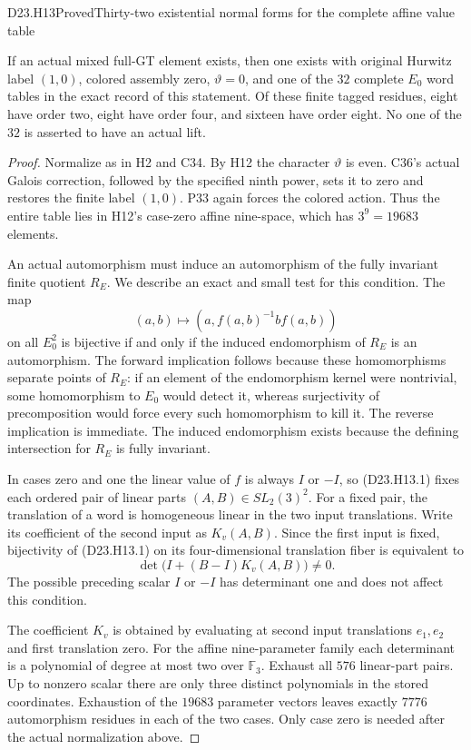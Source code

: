 \begin{statement}{D23.H13}{Proved}{Thirty-two existential normal forms for the complete affine value table}
\end{statement}
If an actual mixed full-GT element exists, then one exists
with original Hurwitz label $(1,0)$, colored assembly zero,
$\vartheta=0$, and one of the $32$ complete $E_0$ word
tables in the exact record of this statement. Of these
finite tagged residues, eight have order two, eight have
order four, and sixteen have order eight. No one of the
$32$ is asserted to have an actual lift.

\begin{proof}
Normalize as in H2 and C34. By H12 the character
$\vartheta$ is even. C36's actual Galois correction,
followed by the specified ninth power, sets it to zero
and restores the finite label $(1,0)$. P33 again forces
the colored action. Thus the entire table lies in H12's
case-zero affine nine-space, which has $3^9=19683$ elements.

An actual automorphism must induce an automorphism of
the fully invariant finite quotient $R_E$. We describe
an exact and small test for this condition. The map
\[
 (a,b)\longmapsto(a,f(a,b)^{-1}b f(a,b))
                                                        \tag{D23.H13.1}
\]
on all $E_0^2$ is bijective if and only if the induced
endomorphism of $R_E$ is an automorphism. The forward
implication follows because these homomorphisms separate
points of $R_E$: if an element of the endomorphism kernel
were nontrivial, some homomorphism to $E_0$ would detect it,
whereas surjectivity of precomposition would force every
such homomorphism to kill it. The reverse implication is
immediate. The induced endomorphism exists because the
defining intersection for $R_E$ is fully invariant.

In cases zero and one the linear value of $f$ is always
$I$ or $-I$, so (D23.H13.1) fixes each ordered pair of
linear parts $(A,B)\in SL_2(3)^2$. For a fixed pair,
the translation of a word is homogeneous linear in the
two input translations. Write its coefficient of the
second input as $K_v(A,B)$. Since the first input is fixed,
bijectivity of (D23.H13.1) on its four-dimensional
translation fiber is equivalent to
\[
           \det\bigl(I+(B-I)K_v(A,B)\bigr)\ne0.
                                                        \tag{D23.H13.2}
\]
The possible preceding scalar $I$ or $-I$ has determinant
one and does not affect this condition.

The coefficient $K_v$ is obtained by evaluating at second
input translations $e_1,e_2$ and first translation zero.
For the affine nine-parameter family each determinant is
a polynomial of degree at most two over $\mathbb F_3$.
Exhaust all $576$ linear-part pairs. Up to nonzero scalar
there are only three distinct polynomials in the stored
coordinates. Exhaustion of the $19683$ parameter vectors
leaves exactly $7776$ automorphism residues in each of the
two cases. Only case zero is needed after the actual
normalization above.


\end{proof}
